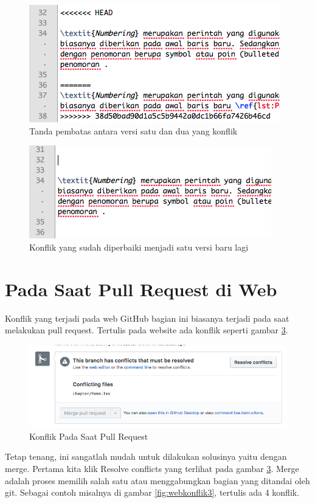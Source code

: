 \begin{figure}[!htbp]
\centerline{\includegraphics[width=.75\textwidth]{Figures/konfliksebelum}}
\caption{Tanda pembatas antara versi satu dan dua yang konflik}
\label{fig:konfliksebelum}
\end{figure}

\begin{figure}[!htbp]
\centerline{\includegraphics[width=.75\textwidth]{Figures/konfliksesudah}}
\caption{Konflik yang sudah diperbaiki menjadi satu versi baru lagi}
\label{fig:konfliksesudah}
\end{figure}


\section{Pada Saat Pull Request di Web}
Konflik yang terjadi pada web GitHub bagian ini biasanya terjadi pada saat melakukan pull request. Tertulis pada website ada konflik seperti gambar \ref{fig:webkonflik1}. 

\begin{figure}[!htbp]
\centerline{\includegraphics[width=.75\textwidth]{Figures/webkonflik1}}
\caption{Konflik Pada Saat Pull Request}
\label{fig:webkonflik1}
\end{figure}

Tetap tenang, ini sangatlah mudah untuk dilakukan solusinya yaitu dengan merge. Pertama kita klik Resolve conflicts yang terlihat pada gambar \ref{fig:webkonflik1}. Merge adalah proses memilih salah satu atau menggabungkan bagian yang ditandai oleh git. Sebagai contoh misalnya di gambar \ref{fig:webkonflik3}, tertulis ada 4 konflik. 

